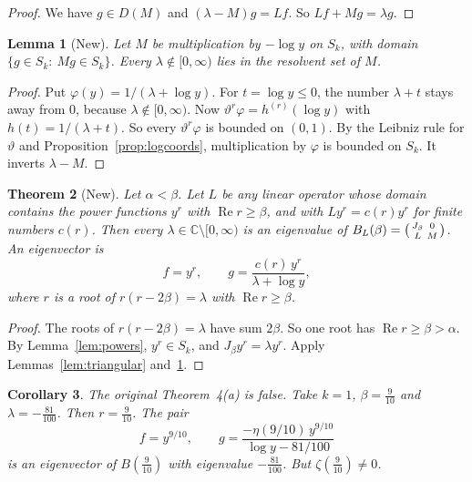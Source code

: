 \documentclass[12pt,letterpaper]{article}
\newtheorem{theorem}{Theorem}[section]
\newtheorem{lemma}[theorem]{Lemma}
\newtheorem{corollary}[theorem]{Corollary}
\theoremstyle{definition}
\theoremstyle{remark}
\newcommand{\Ree}{\operatorname{Re}}
\newcommand{\CC}{\mathbb{C}}
\newcommand{\yD}{\vartheta}
\begin{document}
\begin{proof}
We have $g\in D(M)$ and $(\lambda-M)g=Lf$. So $Lf+Mg=\lambda g$.
\end{proof}

\begin{lemma}[New]\label{lem:resolventM}
Let $M$ be multiplication by $-\log y$ on $S_k$, with domain
$\{g\in S_k:\ Mg\in S_k\}$. Every $\lambda\notin[0,\infty)$ lies in the
resolvent set of $M$.
\end{lemma}

\begin{proof}
Put $\varphi(y)=1/(\lambda+\log y)$. For $t=\log y\le0$, the number
$\lambda+t$ stays away from $0$, because $\lambda\notin[0,\infty)$. Now
$\yD^r\varphi=h^{(r)}(\log y)$ with $h(t)=1/(\lambda+t)$. So every
$\yD^r\varphi$ is bounded on $(0,1)$. By the Leibniz rule for $\yD$ and
Proposition~\ref{prop:logcoords}, multiplication by $\varphi$ is bounded
on $S_k$. It inverts $\lambda-M$.
\end{proof}

\begin{theorem}[New]\label{thm:manyeigen}
Let $\alpha<\beta$. Let $L$ be any linear operator whose domain contains
the power functions $y^r$ with $\Ree r\ge\beta$, and with
$Ly^r=c(r)y^r$ for finite numbers $c(r)$. Then every
$\lambda\in\CC\setminus[0,\infty)$ is an eigenvalue of
$B_L(\beta)=\begin{psmallmatrix}J_\beta&0\\L&M\end{psmallmatrix}$. An
eigenvector is
\[
f=y^r,\qquad g=\frac{c(r)\,y^r}{\lambda+\log y},
\]
where $r$ is a root of $r(r-2\beta)=\lambda$ with $\Ree r\ge\beta$.
\end{theorem}

\begin{proof}
The roots of $r(r-2\beta)=\lambda$ have sum $2\beta$. So one root has
$\Ree r\ge\beta>\alpha$. By Lemma~\ref{lem:powers}, $y^r\in S_k$, and
$J_\beta y^r=\lambda y^r$. Apply Lemmas~\ref{lem:triangular}
and~\ref{lem:resolventM}.
\end{proof}

\begin{corollary}\label{cor:thm4false}
The original Theorem~4(a) is false. Take $k=1$, $\beta=\frac{9}{10}$ and
$\lambda=-\frac{81}{100}$. Then $r=\frac{9}{10}$. The pair
\[
f=y^{9/10},\qquad g=\frac{-\eta(9/10)\,y^{9/10}}{\log y-81/100}
\]
is an eigenvector of $B(\frac{9}{10})$ with eigenvalue
$-\frac{81}{100}$. But $\zeta(\frac{9}{10})\ne0$.
\end{corollary}
\end{document}
